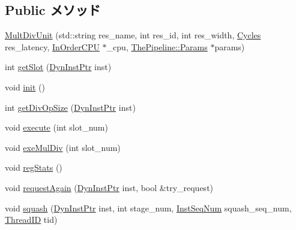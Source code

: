 \subsection*{Public メソッド}
\begin{DoxyCompactItemize}
\item 
\hyperlink{classMultDivUnit_ac2e7df1e1f0836087d602c5018b3dbb1}{MultDivUnit} (std::string res\_\-name, int res\_\-id, int res\_\-width, \hyperlink{classCycles}{Cycles} res\_\-latency, \hyperlink{classInOrderCPU}{InOrderCPU} $\ast$\_\-cpu, \hyperlink{namespaceThePipeline_ab62ca16eeca26566ad2422b5df4943ce}{ThePipeline::Params} $\ast$params)
\item 
int \hyperlink{classMultDivUnit_ab3ba2ee95c723c8c056db0a1f2a6dfd3}{getSlot} (\hyperlink{classRefCountingPtr}{DynInstPtr} inst)
\item 
void \hyperlink{classMultDivUnit_a02fd73d861ef2e4aabb38c0c9ff82947}{init} ()
\item 
int \hyperlink{classMultDivUnit_ab5df8d4b24a252eef4d763a43b469e2b}{getDivOpSize} (\hyperlink{classRefCountingPtr}{DynInstPtr} inst)
\item 
void \hyperlink{classMultDivUnit_a7b7fff82f8c9cbdb02add1346f60bb9e}{execute} (int slot\_\-num)
\item 
void \hyperlink{classMultDivUnit_a4d8dc0aa8b29a51da8e7255c1eae278f}{exeMulDiv} (int slot\_\-num)
\item 
void \hyperlink{classMultDivUnit_a4dc637449366fcdfc4e764cdf12d9b11}{regStats} ()
\item 
void \hyperlink{classMultDivUnit_a9063fd6f97e36e3565247339ffa3882c}{requestAgain} (\hyperlink{classRefCountingPtr}{DynInstPtr} inst, bool \&try\_\-request)
\item 
void \hyperlink{classMultDivUnit_a52235c5e3d912452f254dc45f1496fd2}{squash} (\hyperlink{classRefCountingPtr}{DynInstPtr} inst, int stage\_\-num, \hyperlink{inst__seq_8hh_a258d93d98edaedee089435c19ea2ea2e}{InstSeqNum} squash\_\-seq\_\-num, \hyperlink{base_2types_8hh_ab39b1a4f9dad884694c7a74ed69e6a6b}{ThreadID} tid)
\end{DoxyCompactItemize}
